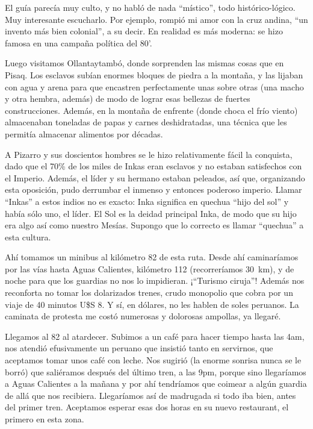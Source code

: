 El guía parecía muy culto, y no habló de nada ``místico'', todo
histórico-lógico. Muy interesante escucharlo. Por ejemplo, rompió mi amor con
la cruz andina, ``un invento más bien colonial'', a su decir. En realidad es
más moderna: se hizo famosa en una campaña política del 80'.

Luego visitamos Ollantaytambó, donde sorprenden las mismas cosas que en Pisaq.
Los esclavos subían enormes bloques de piedra a la montaña, y las lijaban con
agua y arena para que encastren perfectamente unas sobre otras (una macho y otra
hembra, además) de modo de lograr esas bellezas de fuertes construcciones.
Además, en la montaña de enfrente (donde choca el frío viento) almacenaban
toneladas de papas y carnes deshidratadas, una técnica que les permitía
almacenar alimentos por décadas.

A Pizarro y sus doscientos hombres se le hizo relativamente fácil la conquista,
dado que el 70\% de los miles de Inkas eran esclavos y no estaban satisfechos
con el Imperio. Además, el líder y su hermano estaban peleados, así que,
organizando esta oposición, pudo derrumbar el inmenso y entonces poderoso
imperio. Llamar ``Inkas'' a estos indios no es exacto: Inka significa en quechua
``hijo del sol'' y había sólo uno, el líder. El Sol es la deidad principal
Inka, de modo que su hijo era algo así como nuestro Mesías. Supongo que lo
correcto es llamar ``quechua'' a esta cultura.

Ahí tomamos un minibus al kilómetro 82 de esta ruta. Desde ahí
caminaríamos por las vías hasta Aguas Calientes, kilómetro 112
(recorreríamos 30~km), y de noche para que los guardias no nos lo impidieran.
¡``Turismo ciruja''! Además nos reconforta no tomar los
dolarizados trenes, crudo monopolio que cobra por un viaje de 40 minutos U\$S 8.
Y sí, en dólares, no les hablen de soles peruanos. La caminata de protesta me
costó numerosas y dolorosas ampollas, ya llegaré.

Llegamos al 82 al atardecer. Subimos a un café para hacer tiempo hasta las 4am,
nos atendió efusivamente un peruano que insistió tanto en servirnos, que
aceptamos tomar unos café con leche. Nos sugirió (la enorme sonrisa nunca se
le borró) que saliéramos después del último tren, a las 9pm, porque sino
llegaríamos a Aguas Calientes a la mañana y por ahí tendríamos que coimear
a algún guardia de allá que nos recibiera. Llegaríamos así de madrugada si
todo iba bien, antes del primer tren. Aceptamos esperar esas dos horas en su
nuevo restaurant, el primero en esta zona.

